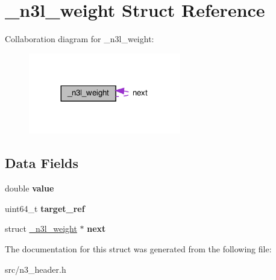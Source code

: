 \hypertarget{struct__n3l__weight}{}\section{\+\_\+n3l\+\_\+weight Struct Reference}
\label{struct__n3l__weight}


Collaboration diagram for \+\_\+n3l\+\_\+weight\+:\nopagebreak
\begin{figure}[H]
\begin{center}
\leavevmode
\includegraphics[width=188pt]{struct__n3l__weight__coll__graph}
\end{center}
\end{figure}
\subsection*{Data Fields}
\begin{DoxyCompactItemize}
\item 
\mbox{\label{struct__n3l__weight_a1d1ebc5e04ba1dd26094993dd94aa710}} 
double {\bfseries value}
\item 
\mbox{\label{struct__n3l__weight_ac5094b52f09a092ffb1cdc4cc594f38f}} 
uint64\+\_\+t {\bfseries target\+\_\+ref}
\item 
\mbox{\label{struct__n3l__weight_adf96faae4820538377678c82ec96d48e}} 
struct \hyperlink{struct__n3l__weight}{\+\_\+n3l\+\_\+weight} $\ast$ {\bfseries next}
\end{DoxyCompactItemize}


The documentation for this struct was generated from the following file\+:\begin{DoxyCompactItemize}
\item 
src/n3\+\_\+header.\+h\end{DoxyCompactItemize}
